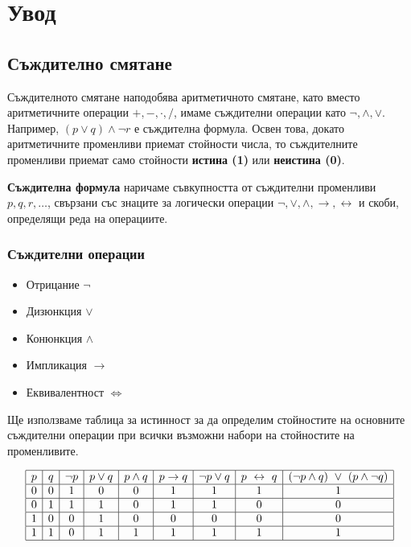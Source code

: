 \chapter{Увод}
\label{ch:intro}

\section{Съждително смятане}
\label{sect:propositional}

Съждителното смятане наподобява аритметичното смятане, като вместо аритметичните операции $+,-,\cdot,/$, 
имаме съждителни операции като $\neg, \wedge, \vee$.
Например, $(p\vee q) \wedge \neg  r$ е съждителна формула.
Освен това, докато аритметичните променливи приемат стойности числа, то
съждителните променливи приемат само стойности {\bf истина (1)} или {\bf неистина (0)}.

{\bf Съждителна формула} наричаме съвкупността от съждителни променливи $p,q,r,\dots$, свързани със знаците за логически операции
$\neg, \vee, \wedge, \rightarrow, \leftrightarrow$ и скоби, определящи реда на операциите.

\subsection*{Съждителни операции}

\begin{itemize}
\item
  Отрицание $\neg$
\item 
  Дизюнкция $\vee$
\item
  Конюнкция $\wedge$
\item
  Импликация $\rightarrow$
\item
  Еквивалентност $\iff$
\end{itemize}

Ще използваме таблица за истинност за да определим стойностите на основните съждителни операции
при всички възможни набори на стойностите на променливите.

\[
\begin{array}{|c|c|c|c|c|c|c|c|c|}
  \hline
  p & q & \neg p & p \vee q & p \wedge q & p \rightarrow q & \neg p \vee q & p \iff q & (\neg{p}\wedge q)\ \vee\ (p\wedge \neg q) \\
  \hline
  0 & 0 & 1 & 0 & 0 & 1 & 1 & 1 & 1\\
  \hline
  0 & 1 & 1 & 1 & 0 & 1 & 1 & 0 & 0\\
  \hline
  1 & 0 & 0 & 1 & 0 & 0 & 0 & 0 & 0\\
  \hline
  1 & 1 & 0 & 1 & 1 & 1 & 1 & 1 & 1\\
  \hline
\end{array}
\]


